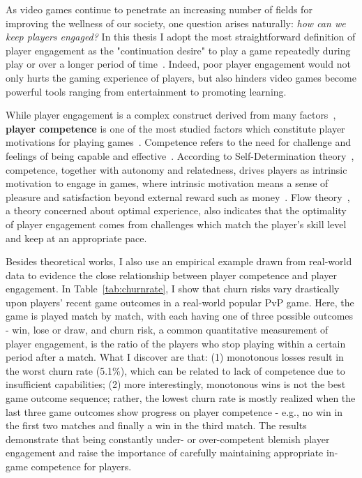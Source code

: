 As video games continue to penetrate an increasing number of fields for improving the wellness of our society, one question arises naturally: \textit{how can we keep players engaged?} In this thesis I adopt the most straightforward definition of player engagement as the "continuation desire" to play a game repeatedly during play or over a longer period of time~\cite{schoenau2011player}. Indeed, poor player engagement would not only hurts the gaming experience of players, but also hinders video games become powerful tools ranging from entertainment to promoting learning. 

While player engagement is a complex construct derived from many factors~\cite{boyle2012engagement,schoenau2011player,choi2004people,brockmyer2009development}, \textbf{player competence} is one of the most studied factors which constitute player motivations for playing games~\cite{ryan2006motivational,przybylski2010motivational,yee2006motivations,wu2010falling,sherry2006video,lazzaro2004we,schoenau2011player}. Competence refers to the need for challenge and feelings of being capable and effective~\cite{przybylski2010motivational,ryan2006motivational}. According to Self-Determination theory~\cite{przybylski2010motivational,ryan2006motivational}, competence, together with autonomy and relatedness, drives players as intrinsic motivation to engage in games, where intrinsic motivation means a sense of pleasure and satisfaction beyond external reward such as money~\cite{deci1985intrinsic}. Flow  theory~\cite{sweetser2005gameflow,flow1990psychology,chen2007flow}, a theory concerned about optimal experience, also indicates that the optimality of player engagement comes from challenges which match the player's skill level and keep at an appropriate pace. 




Besides theoretical works, I also use an empirical example drawn from real-world data to evidence the close relationship between player competence and player engagement. In Table~\ref{tab:churnrate}, I show that churn risks vary drastically upon players' recent game outcomes in a real-world popular PvP game. Here, the game is played match by match, with each having one of three possible outcomes - win, lose or draw, and churn risk, a common quantitative measurement of player engagement, is the ratio of the players who stop playing within a certain period after a match. What I discover are that: (1) monotonous losses result in the worst churn rate (5.1\%), which can be related to lack of competence due to insufficient capabilities; (2) more interestingly, monotonous wins is not the best game outcome sequence; rather, the lowest churn rate is mostly realized when the last three game outcomes show progress on player competence - e.g., no win in the first two matches and finally a win in the third match. The results demonstrate that being constantly under- or over-competent blemish player engagement and raise the importance of carefully maintaining appropriate in-game competence for players.               

